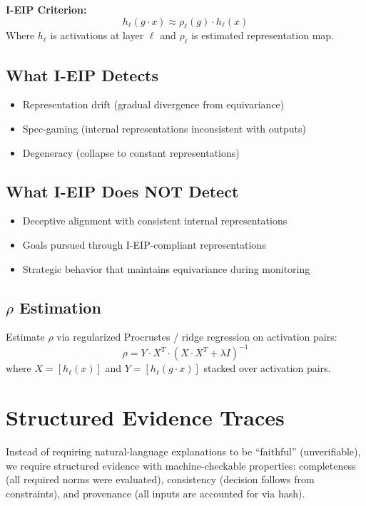 \documentclass[11pt,letterpaper]{article}
\theoremstyle{definition}
\theoremstyle{remark}
\begin{document}
\textbf{I-EIP Criterion:}
\[
h_\ell(g \cdot x) \approx \rho_\ell(g) \cdot h_\ell(x)
\]
Where $h_\ell$ is activations at layer $\ell$ and $\rho_\ell$ is estimated representation map.

\subsection{What I-EIP Detects}
\begin{itemize}
\item Representation drift (gradual divergence from equivariance)
\item Spec-gaming (internal representations inconsistent with outputs)
\item Degeneracy (collapse to constant representations)
\end{itemize}

\subsection{What I-EIP Does NOT Detect}
\begin{itemize}
\item Deceptive alignment with consistent internal representations
\item Goals pursued through I-EIP-compliant representations
\item Strategic behavior that maintains equivariance during monitoring
\end{itemize}

\subsection{$\rho$ Estimation}

Estimate $\rho$ via regularized Procrustes / ridge regression on activation pairs:
\[
\rho = Y \cdot X^T \cdot (X \cdot X^T + \lambda I)^{-1}
\]
where $X = [h_\ell(x)]$ and $Y = [h_\ell(g \cdot x)]$ stacked over activation pairs.

\section{Structured Evidence Traces}

Instead of requiring natural-language explanations to be ``faithful'' (unverifiable), we require structured evidence with machine-checkable properties: completeness (all required norms were evaluated), consistency (decision follows from constraints), and provenance (all inputs are accounted for via hash).
\end{document}
